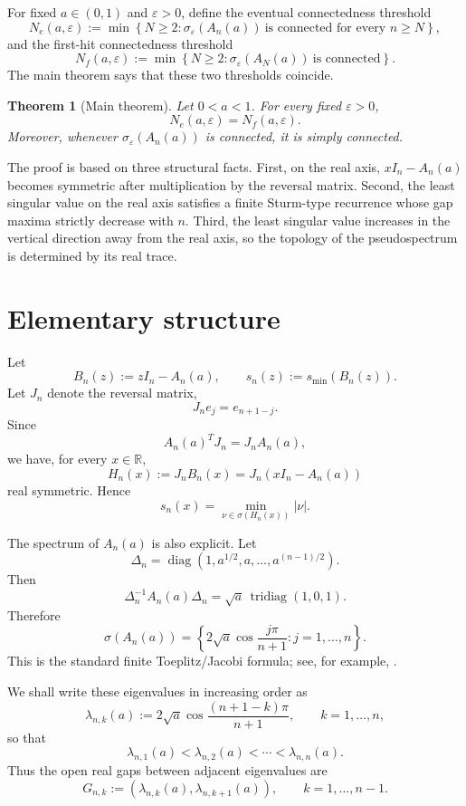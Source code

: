 \documentclass[11pt]{amsart}
\numberwithin{equation}{section}
\DeclareMathOperator{\tridiag}{tridiag}
\DeclareMathOperator{\diag}{diag}
\newcommand{\R}{\mathbb R}
\newcommand{\eps}{\varepsilon}
\newtheorem{theorem}{Theorem}[section]
\begin{document}
For fixed \(a\in(0,1)\) and \(\eps>0\), define the eventual connectedness threshold
\[
N_e(a,\eps)
:=
\min
\left\{
N\ge2:
\sigma_\eps(A_n(a))\ \text{is connected for every }n\ge N
\right\},
\]
and the first-hit connectedness threshold
\[
N_f(a,\eps)
:=
\min
\left\{
N\ge2:
\sigma_\eps(A_N(a))\ \text{is connected}
\right\}.
\]
The main theorem says that these two thresholds coincide.

\begin{theorem}[Main theorem]\label{thm:main}
Let \(0<a<1\).  For every fixed \(\eps>0\),
\[
N_e(a,\eps)=N_f(a,\eps).
\]
Moreover, whenever \(\sigma_\eps(A_n(a))\) is connected, it is simply connected.
\end{theorem}

The proof is based on three structural facts.  First, on the real axis, \(xI_n-A_n(a)\) becomes symmetric after multiplication by the reversal matrix.  Second, the least singular value on the real axis satisfies a finite Sturm-type recurrence whose gap maxima strictly decrease with \(n\).  Third, the least singular value increases in the vertical direction away from the real axis, so the topology of the pseudospectrum is determined by its real trace.

\section{Elementary structure}

Let
\[
B_n(z):=zI_n-A_n(a),
\qquad
s_n(z):=s_{\min}(B_n(z)).
\]
Let \(J_n\) denote the reversal matrix,
\[
J_n e_j=e_{n+1-j}.
\]
Since
\[
A_n(a)^T J_n=J_nA_n(a),
\]
we have, for every \(x\in\R\),
\[
H_n(x):=J_nB_n(x)=J_n(xI_n-A_n(a))
\]
real symmetric.  Hence
\begin{equation}\label{eq:real-axis-smin}
s_n(x)
=
\min_{\nu\in\sigma(H_n(x))}|\nu|.
\end{equation}

The spectrum of \(A_n(a)\) is also explicit.  Let
\[
\Delta_n=\diag(1,a^{1/2},a,\dots,a^{(n-1)/2}).
\]
Then
\[
\Delta_n^{-1}A_n(a)\Delta_n
=
\sqrt a\,\tridiag(1,0,1).
\]
Therefore
\begin{equation}\label{eq:toeplitz-spectrum}
\sigma(A_n(a))
=
\left\{
2\sqrt a\cos\frac{j\pi}{n+1}:j=1,\dots,n
\right\}.
\end{equation}
This is the standard finite Toeplitz/Jacobi formula; see, for example, \cite{BottcherGrudsky2005,HornJohnson2013}.

We shall write these eigenvalues in increasing order as
\[
\lambda_{n,k}(a)
:=
2\sqrt a\cos\frac{(n+1-k)\pi}{n+1},
\qquad k=1,\dots,n,
\]
so that
\[
\lambda_{n,1}(a)
<
\lambda_{n,2}(a)
<
\cdots
<
\lambda_{n,n}(a).
\]
Thus the open real gaps between adjacent eigenvalues are
\[
G_{n,k}
:=
(\lambda_{n,k}(a),\lambda_{n,k+1}(a)),
\qquad
k=1,\dots,n-1.
\]
\end{document}
